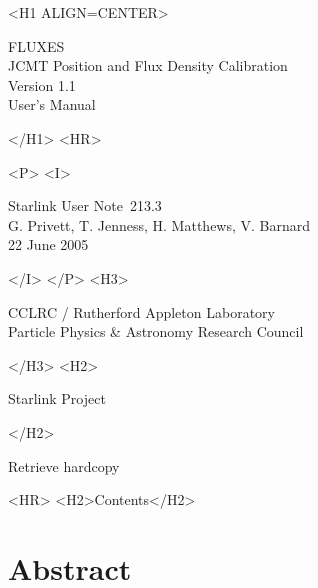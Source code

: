 \documentclass[11pt,twoside]{article}
\newcommand{\stardoccategory}  {Starlink User Note}
\newcommand{\stardocsource}    {sun213.3}
\newcommand{\stardocnumber}    {213.3}
\newcommand{\stardocauthors}   {G. Privett, T. Jenness, H. Matthews, V. Barnard}
\newcommand{\stardocdate}      {22 June 2005}
\newcommand{\stardoctitle}     {FLUXES\\[1ex]
                                JCMT Position and Flux Density Calibration}
\newcommand{\stardocversion}   {Version 1.1}
\newcommand{\stardocmanual}    {User's Manual}
\newcommand{\htmladdnormallink}[2]{#1}
\newcommand{\htmladdimg}[1]{}
\newcommand{\htmlref}[2]{#1}
\newcommand{\htmladdtonavigation}[1]{}
\newcommand{\xlabel}[1]{}
\renewcommand{\_}{\texttt{\symbol{95}}}
\begin{document}
\begin{htmlonly}
   \xlabel{}
   \begin{rawhtml} <H1 ALIGN=CENTER> \end{rawhtml}
      \stardoctitle\\
      \stardocversion\\
      \stardocmanual
   \begin{rawhtml} </H1> <HR> \end{rawhtml}


   \begin{rawhtml} <P> <I> \end{rawhtml}
   \stardoccategory\ \stardocnumber \\
   \stardocauthors \\
   \stardocdate
   \begin{rawhtml} </I> </P> <H3> \end{rawhtml}
      \htmladdnormallink{CCLRC}{http://www.cclrc.ac.uk} /
      \htmladdnormallink{Rutherford Appleton Laboratory}
                        {http://www.cclrc.ac.uk/ral} \\
      \htmladdnormallink{Particle Physics \& Astronomy Research Council}
                        {http://www.pparc.ac.uk} \\
   \begin{rawhtml} </H3> <H2> \end{rawhtml}
      \htmladdnormallink{Starlink Project}{http://www.starlink.rl.ac.uk/}
   \begin{rawhtml} </H2> \end{rawhtml}
   \htmladdnormallink{\htmladdimg{source.gif} Retrieve hardcopy}
      {http://www.starlink.rl.ac.uk/cgi-bin/hcserver?\stardocsource}\\

  \label{stardoccontents}
  \begin{rawhtml} 
    <HR>
    <H2>Contents</H2>
  \end{rawhtml}
  \htmladdtonavigation{\htmlref{\htmladdimg{contents_motif.gif}}
        {stardoccontents}}

  \section{\xlabel{abstract}Abstract}
\end{htmlonly}
\end{document}
